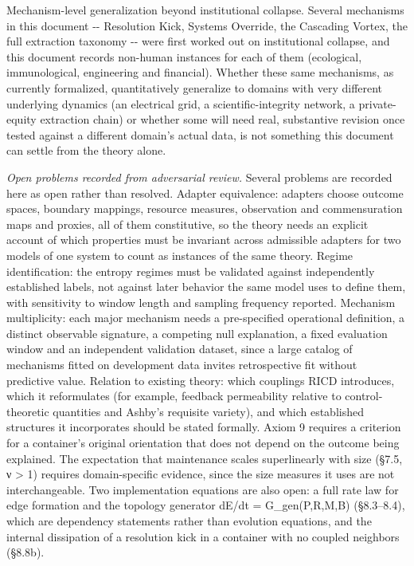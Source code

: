 \documentclass[
]{article}
\begin{document}
Mechanism-level generalization beyond institutional collapse. Several
mechanisms in this document -\/- Resolution Kick, Systems Override, the
Cascading Vortex, the full extraction taxonomy -\/- were first worked
out on institutional collapse, and this document records non-human
instances for each of them (ecological, immunological, engineering and
financial). Whether these same mechanisms, as currently formalized,
quantitatively generalize to domains with very different underlying
dynamics (an electrical grid, a scientific-integrity network, a
private-equity extraction chain) or whether some will need real,
substantive revision once tested against a different domain's actual
data, is not something this document can settle from the theory alone.

\emph{Open problems recorded from adversarial review.} Several problems
are recorded here as open rather than resolved. Adapter equivalence:
adapters choose outcome spaces, boundary mappings, resource measures,
observation and commensuration maps and proxies, all of them
constitutive, so the theory needs an explicit account of which
properties must be invariant across admissible adapters for two models
of one system to count as instances of the same theory. Regime
identification: the entropy regimes must be validated against
independently established labels, not against later behavior the same
model uses to define them, with sensitivity to window length and
sampling frequency reported. Mechanism multiplicity: each major
mechanism needs a pre-specified operational definition, a distinct
observable signature, a competing null explanation, a fixed evaluation
window and an independent validation dataset, since a large catalog of
mechanisms fitted on development data invites retrospective fit without
predictive value. Relation to existing theory: which couplings RICD
introduces, which it reformulates (for example, feedback permeability
relative to control-theoretic quantities and Ashby's requisite variety),
and which established structures it incorporates should be stated
formally. Axiom 9 requires a criterion for a container's original
orientation that does not depend on the outcome being explained. The
expectation that maintenance scales superlinearly with size (§7.5, ν
\textgreater{} 1) requires domain-specific evidence, since the size
measures it uses are not interchangeable. Two implementation equations
are also open: a full rate law for edge formation and the topology
generator dE/dt = G\_gen(P,R,M,B) (§8.3--8.4), which are dependency
statements rather than evolution equations, and the internal dissipation
of a resolution kick in a container with no coupled neighbors (§8.8b).
\end{document}

